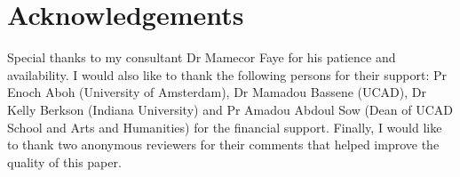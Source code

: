 \documentclass[output=paper]{langscibook}
\begin{document}
\section*{Acknowledgements}

Special thanks to my consultant Dr Mamecor Faye for his patience and availability. I would also like to thank the following persons for their support: Pr Enoch Aboh (University of Amsterdam), Dr Mamadou Bassene (UCAD), Dr Kelly Berkson (Indiana University) and Pr Amadou Abdoul Sow (Dean of UCAD School and Arts and Humanities) for the financial support. Finally, I would like to thank two anonymous reviewers for their comments that helped improve the quality of this paper.

{\sloppy
\printbibliography[heading=subbibliography,notkeyword=this] 
}
\end{document}
